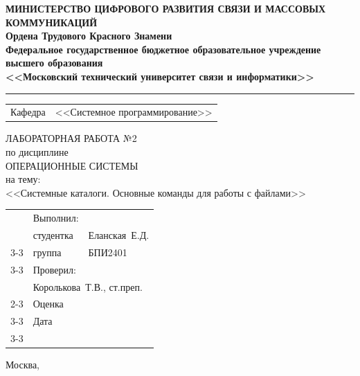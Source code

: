 \thispagestyle{empty}

\begin{center}
	\textbf{МИНИСТЕРСТВО ЦИФРОВОГО РАЗВИТИЯ СВЯЗИ И МАССОВЫХ КОММУНИКАЦИЙ} \\
	\textbf{Ордена Трудового Красного Знамени \\
		Федеральное государственное бюджетное образовательное учреждение высшего образования \\
		<<Московский технический университет связи и информатики>>}
\end{center}
\rule{\linewidth}{1pt}

\vspace{0.3em}

\begin{center}
	\begin{tabularx}{0.6\textwidth}{p{1.2cm}X}
		Кафедра & \quad <<Системное программирование>> \\%
	\end{tabularx}
\end{center}

\vspace{10em}

\begin{center}
	\Large
	ЛАБОРАТОРНАЯ РАБОТА №2 \\
	\large
	по дисциплине \\
	ОПЕРАЦИОННЫЕ СИСТЕМЫ \\
	на тему: \\
	<<Системные каталоги. Основные команды для работы с файлами>>
\end{center}

\vspace{4em}

\renewcommand{\arraystretch}{1.1}
\begin{tabularx}{\textwidth}{p{10cm}p{2cm}p{3cm}}
	& Выполнил: & \\
	& студентка & Еланская~Е.Д. \\\cline{3-3} 
	& группа & БПИ2401 \\\cline{3-3} 
	& Проверил: &  \\
	& \multicolumn{2}{l}{Королькова~Т.В., ст.преп.} \\\cline{2-3}
	& Оценка & \\\cline{3-3} 
	& Дата & \\\cline{3-3} 
\end{tabularx}

\vspace{5em}

\begin{center}
	Москва,~\the\year
\end{center}
\clearpage

